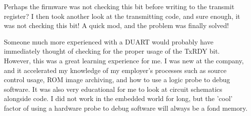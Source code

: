 Perhaps the firmware was not checking this bit before writing to the transmit
register? I then took another look at the transmitting code, and sure enough, it
was not checking this bit! A quick mod, and the problem was finally solved!

\par
Someone much more experienced with a DUART would probably have immediately
thought of checking for the proper usage of the TxRDY bit. However, this was a
great learning experience for me. I was new at the company, and it accelerated
my knowledge of my employer's processes such as source control usage, ROM image
archiving, and how to use a logic probe to debug software. It was also very
educational for me to look at circuit schematics alongside code. I did not work
in the embedded world for long, but the 'cool' factor of using a hardware probe
to debug software will always be a fond memory.